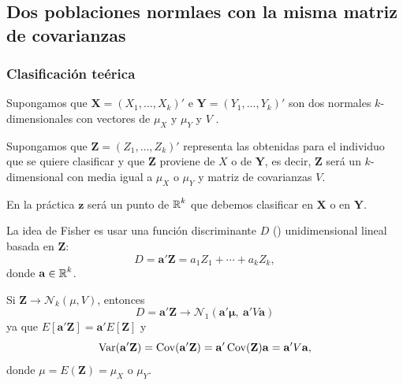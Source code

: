 \subsection{Dos poblaciones normlaes con la misma matriz de covarianzas}
\subsubsection{Clasificación teérica}
Supongamos que $\mathbf{X}=(X_1,\dots,X_k)'$ e $\mathbf{Y}=(Y_1,\dots,Y_k)'$ son dos \veas normales $k$-dimensionales con vectores de  $\mu_X$ y $\mu_Y$ y  $V$ .

Supongamos que $\mathbf{Z}=(Z_1,\dots,Z_k)'$ representa las  obtenidas para el individuo que se quiere clasificar y que $\mathbf{Z}$ proviene de $X$ o de $\mathbf{Y}$, es decir, $\mathbf{Z}$ será un \vea $k$-dimensional con media igual a $\mu_X$ o $\mu_Y$ y matriz de covarianzas $V$.

En la práctica $\mathbf{z}$ será un punto de $\operatorname{\mathbb{R}}^k$ que debemos clasificar en $\mathbf{X}$ o en $\mathbf{Y}$.

La idea de Fisher es usar una función discriminante $D$ () unidimensional lineal basada en $\mathbf{Z}$: \[ D=\mathbf{a'Z}=a_1Z_1+\cdots+a_kZ_k, \]donde $\mathbf{a}\in\operatorname{\mathbb{R}}^k$.

Si $\mathbf{Z}\longrightarrow\mathcal{N}_k(\mu,V)$, entonces \[ D=\mathbf{a'Z}\longrightarrow \mathcal{N}_1(\mathbf{a'\mu},\: \mathbf{a'}V\mathbf{a}) \]ya que $E[\mathbf{a'Z}]=\mathbf{a'}E[\mathbf{Z}]$ y \[ \operatorname{Var}(\mathbf{a'Z})=\operatorname{Cov}(\mathbf{a'Z})=\mathbf{a'}\operatorname{Cov}(\mathbf{Z})\mathbf{a}=\mathbf{a'}V\mathbf{a}, \]donde $\mu=E(\mathbf{Z})=\mu_X$ o $\mu_Y$.

